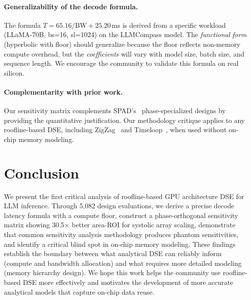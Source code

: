 \documentclass[sigconf,10pt]{acmart}
\begin{document}
\paragraph{Generalizability of the decode formula.}
The formula $T = 65.16/\text{BW} + 25.20$\,ms is derived from a specific
workload (LLaMA-70B, bs=16, sl=1024) on the LLMCompass model. The
\emph{functional form} (hyperbolic with floor) should generalize because
the floor reflects non-memory compute overhead, but the \emph{coefficients}
will vary with model size, batch size, and sequence length. We encourage
the community to validate this formula on real silicon.

\paragraph{Complementarity with prior work.}
Our sensitivity matrix complements SPAD's~\cite{spad2025}
phase-specialized designs by providing the quantitative justification.
Our methodology critique applies to any roofline-based DSE, including
ZigZag~\cite{zigzag2021} and Timeloop~\cite{parashar2019timeloop},
when used without on-chip memory modeling.

\section{Conclusion}
\label{sec:conclusion}

We present the first critical analysis of roofline-based GPU architecture
DSE for LLM inference. Through 5,082 design evaluations, we derive a
precise decode latency formula with a compute floor, construct a
phase-orthogonal sensitivity matrix showing 30.5$\times$ better area-ROI
for systolic array scaling, demonstrate that common sensitivity analysis
methodology produces phantom sensitivities, and identify a critical blind
spot in on-chip memory modeling. These findings establish the boundary
between what analytical DSE can reliably inform (compute and bandwidth
allocation) and what requires more detailed modeling (memory hierarchy
design). We hope this work helps the community use roofline-based DSE
more effectively and motivates the development of more accurate analytical
models that capture on-chip data reuse.


\end{document}
